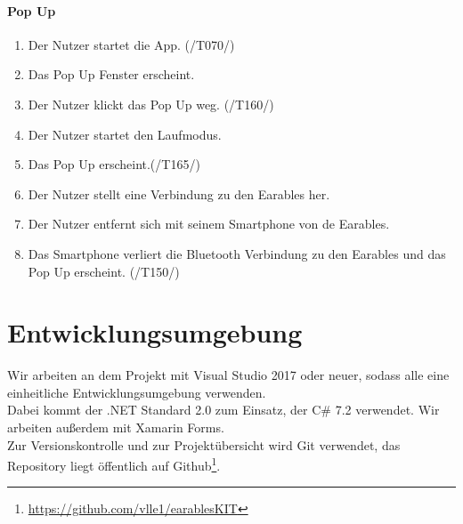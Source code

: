 \documentclass[a4paper,12pt]{article}
\begin{document}
    \paragraph{Pop Up}
    \begin{enumerate}
	\item Der Nutzer startet die App. (/T070/)
 	\item Das Pop Up Fenster erscheint.
 	\item Der Nutzer klickt das Pop Up weg. (/T160/)
 	\item Der Nutzer startet den Laufmodus.
 	\item Das Pop Up erscheint.(/T165/)
 	\item Der Nutzer stellt eine Verbindung zu den \gls{Earables} her.
 	\item Der Nutzer entfernt sich mit seinem Smartphone von de \gls{Earables}.
 	\item Das Smartphone verliert die Bluetooth Verbindung zu den \gls{Earables} und das Pop Up erscheint. (/T150/)
    \end{enumerate}

\section{Entwicklungsumgebung}
Wir arbeiten an dem Projekt mit Visual Studio 2017 oder neuer, sodass alle eine einheitliche Entwicklungsumgebung verwenden.\\
Dabei kommt der .NET Standard 2.0 zum Einsatz, der C\# 7.2 verwendet. Wir arbeiten außerdem mit Xamarin Forms.\\
Zur Versionskontrolle und zur Projektübersicht wird Git verwendet, das Repository liegt öffentlich auf Github\footnote{\url{https://github.com/vlle1/earablesKIT}}.
\clearpage
\printglossaries
{}
\end{document}
